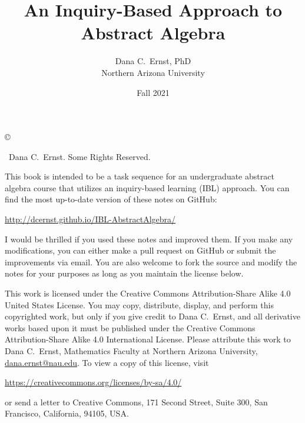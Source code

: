 \documentclass[12pt,oneside]{book}
\theoremstyle{definition}
\begin{document}
\title{An Inquiry-Based Approach to Abstract Algebra}
\author{Dana C.~Ernst, PhD\\
Northern Arizona University}
\date{Fall 2021}

\maketitle

\noindent\copyright{ \the\year\ Dana C.~Ernst.  Some Rights Reserved.\\

\bigskip

\noindent This book is intended to be a task sequence for an undergraduate abstract algebra course that utilizes an inquiry-based learning (IBL) approach.  You can find the most up-to-date version of these notes on GitHub:
\begin{center}
\url{http://dcernst.github.io/IBL-AbstractAlgebra/}
\end{center}
I would be thrilled if you used these notes and improved them. If you make any modifications, you can either make a pull request on GitHub or submit the improvements via email.  You are also welcome to fork the source and modify the notes for your purposes as long as you maintain the license below.

\bigskip

\noindent This work is licensed under the Creative Commons Attribution-Share Alike 4.0 United States License.  You may copy, distribute, display, and perform this copyrighted work, but only if you give credit to Dana C.~Ernst, and all derivative works based upon it must be published under the Creative Commons Attribution-Share Alike 4.0 International License. Please attribute this work to Dana C.~Ernst, Mathematics Faculty at Northern Arizona University, \url{dana.ernst@nau.edu}. To view a copy of this license, visit
\begin{center}
\url{https://creativecommons.org/licenses/by-sa/4.0/}
\end{center}
or send a letter to Creative Commons, 171 Second Street, Suite 300, San Francisco, California, 94105, USA.}

\medskip

\begin{center}
\ccbysa
\end{center}

\tableofcontents














\end{document}
